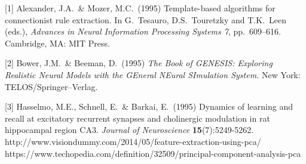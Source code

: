 \documentclass{article}
\begin{document}
\small

[1] Alexander, J.A.\ \& Mozer, M.C.\ (1995) Template-based algorithms for
connectionist rule extraction. In G.\ Tesauro, D.S.\ Touretzky and T.K.\ Leen
(eds.), {\it Advances in Neural Information Processing Systems 7},
pp.\ 609--616. Cambridge, MA: MIT Press.

[2] Bower, J.M.\ \& Beeman, D.\ (1995) {\it The Book of GENESIS: Exploring
  Realistic Neural Models with the GEneral NEural SImulation System.}  New York:
TELOS/Springer--Verlag.

[3] Hasselmo, M.E., Schnell, E.\ \& Barkai, E.\ (1995) Dynamics of learning and
recall at excitatory recurrent synapses and cholinergic modulation in rat
hippocampal region CA3. {\it Journal of Neuroscience} {\bf 15}(7):5249-5262.
http://www.visiondummy.com/2014/05/feature-extraction-using-pca/
https://www.techopedia.com/definition/32509/principal-component-analysis-pca
\end{document}
